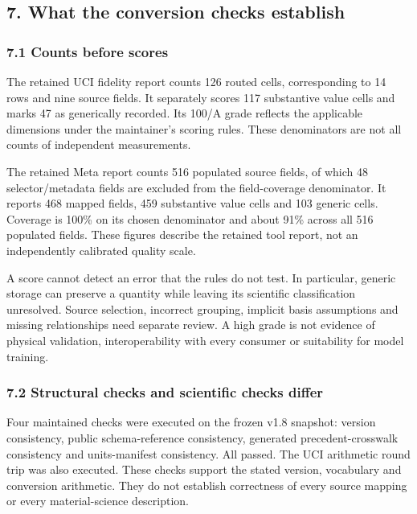 \documentclass[
  american,
  11pt,
  letterpaper,
]{article}
\begin{document}
\subsection{7. What the conversion checks
establish}\label{what-the-conversion-checks-establish}

\subsubsection{7.1 Counts before scores}\label{counts-before-scores}

The retained UCI fidelity report counts 126 routed cells, corresponding
to 14 rows and nine source fields. It separately scores 117 substantive
value cells and marks 47 as generically recorded. Its 100/A grade
reflects the applicable dimensions under the maintainer's scoring rules.
These denominators are not all counts of independent measurements.

The retained Meta report counts 516 populated source fields, of which 48
selector/metadata fields are excluded from the field-coverage
denominator. It reports 468 mapped fields, 459 substantive value cells
and 103 generic cells. Coverage is 100\% on its chosen denominator and
about 91\% across all 516 populated fields. These figures describe the
retained tool report, not an independently calibrated quality scale.

A score cannot detect an error that the rules do not test. In
particular, generic storage can preserve a quantity while leaving its
scientific classification unresolved. Source selection, incorrect
grouping, implicit basis assumptions and missing relationships need
separate review. A high grade is not evidence of physical validation,
interoperability with every consumer or suitability for model training.

\subsubsection{7.2 Structural checks and scientific checks
differ}\label{structural-checks-and-scientific-checks-differ}

Four maintained checks were executed on the frozen v1.8 snapshot:
version consistency, public schema-reference consistency, generated
precedent-crosswalk consistency and units-manifest consistency. All
passed. The UCI arithmetic round trip was also executed. These checks
support the stated version, vocabulary and conversion arithmetic. They
do not establish correctness of every source mapping or every
material-science description.
\end{document}
